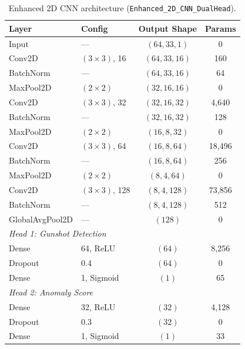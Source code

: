 \documentclass[conference]{IEEEtran}
\begin{document}
\begin{table}[!t]
\centering
\caption{Enhanced 2D CNN architecture (\texttt{Enhanced\_2D\_CNN\_DualHead}).}
\label{tab:arch_enh2d}
\footnotesize
\begin{tabular}{llcc}
\toprule
\textbf{Layer} & \textbf{Config} & \textbf{Output Shape} & \textbf{Params} \\
\midrule
Input & --- & $(64, 33, 1)$ & 0 \\
Conv2D & $(3\!\times\!3)$, 16 & $(64, 33, 16)$ & 160 \\
BatchNorm & --- & $(64, 33, 16)$ & 64 \\
MaxPool2D & $(2\!\times\!2)$ & $(32, 16, 16)$ & 0 \\
Conv2D & $(3\!\times\!3)$, 32 & $(32, 16, 32)$ & 4{,}640 \\
BatchNorm & --- & $(32, 16, 32)$ & 128 \\
MaxPool2D & $(2\!\times\!2)$ & $(16, 8, 32)$ & 0 \\
Conv2D & $(3\!\times\!3)$, 64 & $(16, 8, 64)$ & 18{,}496 \\
BatchNorm & --- & $(16, 8, 64)$ & 256 \\
MaxPool2D & $(2\!\times\!2)$ & $(8, 4, 64)$ & 0 \\
Conv2D & $(3\!\times\!3)$, 128 & $(8, 4, 128)$ & 73{,}856 \\
BatchNorm & --- & $(8, 4, 128)$ & 512 \\
GlobalAvgPool2D & --- & $(128)$ & 0 \\
\midrule
\multicolumn{4}{l}{\textit{Head 1: Gunshot Detection}} \\
Dense & 64, ReLU & $(64)$ & 8{,}256 \\
Dropout & 0.4 & $(64)$ & 0 \\
Dense & 1, Sigmoid & $(1)$ & 65 \\
\midrule
\multicolumn{4}{l}{\textit{Head 2: Anomaly Score}} \\
Dense & 32, ReLU & $(32)$ & 4{,}128 \\
Dropout & 0.3 & $(32)$ & 0 \\
Dense & 1, Sigmoid & $(1)$ & 33 \\
\bottomrule
\end{tabular}
\end{table}
\end{document}

